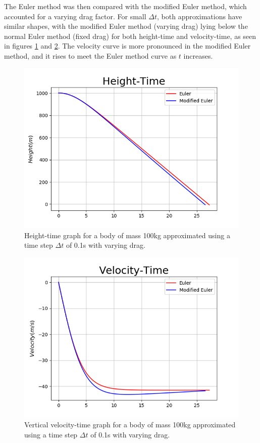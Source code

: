 \documentclass[twocolumn,prl,nobalancelastpage,aps,10pt]{revtex4-1}
\begin{document}
The Euler method was then compared with the modified Euler method, which accounted for a varying drag factor. For small $\Delta t$, both approximations have similar shapes, with the modified Euler method (varying drag) lying below the normal Euler method (fixed drag) for both height-time and velocity-time, as seen in figures \ref{euler-fig-ht-t=0.25} and \ref{euler-fig-vt-t=0.25}. The velocity curve is more pronounced in the modified Euler method, and it rises to meet the Euler method curve as $t$ increases.
\begin{figure}
	\includegraphics*[width=0.96\linewidth,clip]{euler-fig-ht-t=025}
	\caption{Height-time graph for a body of mass 100kg approximated using a time step $\Delta t$ of  0.1s with varying drag.}\label{euler-fig-ht-t=0.25}
\end{figure}
\begin{figure}
	\includegraphics*[width=0.96\linewidth,clip]{euler-fig-vt-t=025}
	\caption{Vertical velocity-time graph for a body of mass 100kg approximated using a time step $\Delta t$ of  0.1s with varying drag.}\label{euler-fig-vt-t=0.25}
\end{figure}
\end{document}
